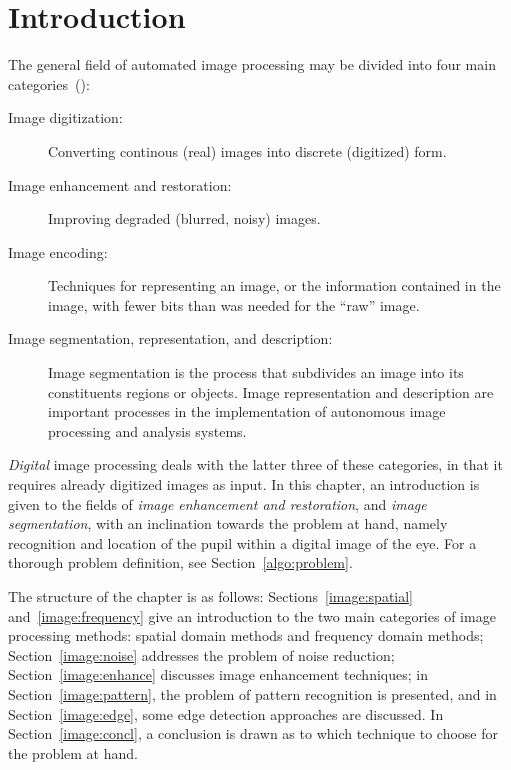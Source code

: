 
\section{Introduction}
\label{image:intro}

The general field of automated image processing may be divided into
four main categories~(\cite{digim}):

\begin{description}
\item[Image digitization:] Converting continous (real) images into
  discrete (digitized) form.
\item[Image enhancement and restoration:] Improving degraded (blurred,
  noisy) images.
\item[Image encoding:] Techniques for representing an image, or the
  information contained in the image, with fewer bits than was needed
  for the ``raw'' image.
\item[Image segmentation, representation, and description:] Image
  segmentation is the process that subdivides an image into its
  constituents regions or objects.  Image representation and
  description are important processes in the implementation of
  autonomous image processing and analysis systems.
\end{description}

{\em Digital\/} image processing deals with the latter three of these
categories, in that it requires already digitized images as input.  In
this chapter, an introduction is given to the fields of {\em image
  enhancement and restoration\/}, and {\em image segmentation\/}, with
an inclination towards the problem at hand, namely recognition and
location of the pupil within a digital image of the eye.  For a
thorough problem definition, see Section~\ref{algo:problem}.

The structure of the chapter is as follows:
Sections~\ref{image:spatial} and~\ref{image:frequency} give an
introduction to the two main categories of image processing methods:
spatial domain methods and frequency domain methods;
Section~\ref{image:noise} addresses the problem of noise reduction;
Section~\ref{image:enhance} discusses image enhancement techniques; in
Section~\ref{image:pattern}, the problem of pattern recognition is
presented, and in Section~\ref{image:edge}, some edge detection
approaches are discussed.  In Section~\ref{image:concl}, a conclusion
is drawn as to which technique to choose for the problem at hand.
